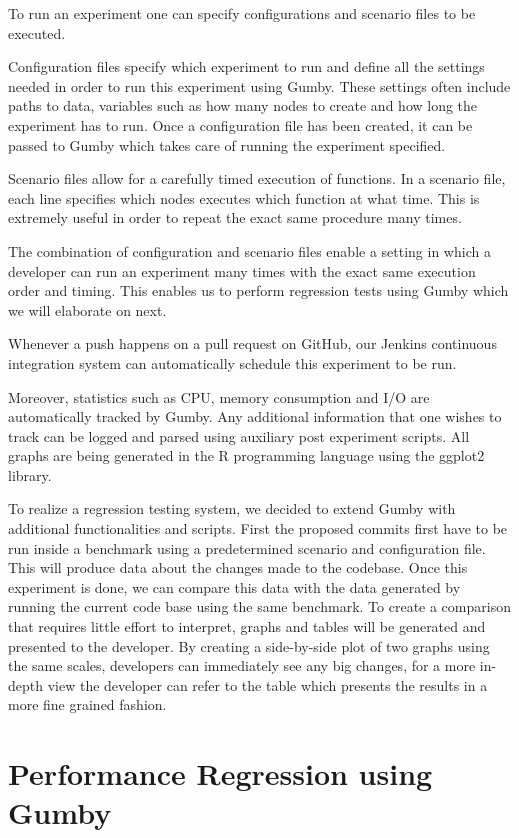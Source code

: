 To run an experiment one can specify configurations and scenario files to be executed.

Configuration files specify which experiment to run and define all the settings needed in order to run this experiment using Gumby.
These settings often include paths to data, variables such as how many nodes to create and how long the experiment has to run.
Once a configuration file has been created, it can be passed to Gumby which takes care of running the experiment specified.

Scenario files allow for a carefully timed execution of functions.
In a scenario file, each line specifies which nodes executes which function at what time.
This is extremely useful in order to repeat the exact same procedure many times.

The combination of configuration and scenario files enable a setting in which a developer can run an experiment many times with the exact same execution order and timing.
This enables us to perform regression tests using Gumby which we will elaborate on next.

Whenever a push happens on a pull request on GitHub, our Jenkins continuous integration system can automatically schedule this experiment to be run. 

Moreover, statistics such as CPU, memory consumption and I/O are automatically tracked by Gumby.
Any additional information that one wishes to track can be logged and parsed using auxiliary post experiment scripts.
All graphs are being generated in the R programming language using the ggplot2 library.

To realize a regression testing system, we decided to extend Gumby with additional functionalities and scripts.
First the proposed commits first have to be run inside a benchmark using a predetermined scenario and configuration file.
This will produce data about the changes made to the codebase.
Once this experiment is done, we can compare this data with the data generated by running the current code base using the same benchmark.
To create a comparison that requires little effort to interpret, graphs and tables will be generated and presented to the developer.
By creating a side-by-side plot of two graphs using the same scales, developers can immediately see any big changes, for a more in-depth view the developer can refer to the table which presents the results in a more fine grained fashion.

\section{Performance Regression using Gumby}

